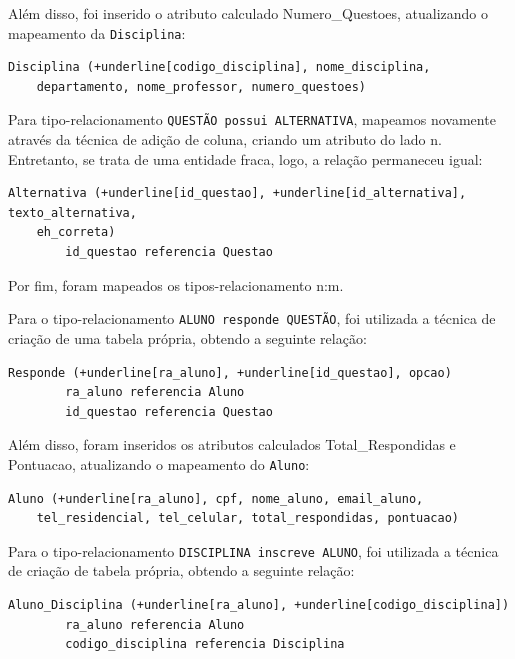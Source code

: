 \documentclass[12pt,a4paper]{article}
\begin{document}
Além disso, foi inserido o atributo calculado Numero\_Questoes, atualizando o mapeamento da \texttt{Disciplina}:

\begin{Verbatim}[commandchars=+\[\]]
    Disciplina (+underline[codigo_disciplina], nome_disciplina,
    departamento, nome_professor, numero_questoes)
\end{Verbatim}

Para tipo-relacionamento \texttt{QUESTÃO possui ALTERNATIVA}, mapeamos novamente através da técnica de adição de coluna, criando um atributo do lado n. Entretanto, se trata de uma entidade fraca, logo, a relação permaneceu igual:

\begin{Verbatim}[commandchars=+\[\]]
    Alternativa (+underline[id_questao], +underline[id_alternativa], texto_alternativa, 
    eh_correta)
        id_questao referencia Questao
\end{Verbatim}

Por fim, foram mapeados os tipos-relacionamento n:m.

Para o tipo-relacionamento \texttt{ALUNO responde QUESTÃO}, foi utilizada a técnica de criação de uma tabela própria, obtendo a seguinte relação:

\begin{Verbatim}[commandchars=+\[\]]
    Responde (+underline[ra_aluno], +underline[id_questao], opcao)
        ra_aluno referencia Aluno
        id_questao referencia Questao
\end{Verbatim}

Além disso, foram inseridos os atributos calculados Total\_Respondidas e Pontuacao, atualizando o mapeamento do \texttt{Aluno}:

\begin{Verbatim}[commandchars=+\[\]]
    Aluno (+underline[ra_aluno], cpf, nome_aluno, email_aluno, 
    tel_residencial, tel_celular, total_respondidas, pontuacao)
\end{Verbatim}

Para o tipo-relacionamento \texttt{DISCIPLINA inscreve ALUNO}, foi utilizada a técnica de criação de tabela própria, obtendo a seguinte relação:

\begin{Verbatim}[commandchars=+\[\]]
    Aluno_Disciplina (+underline[ra_aluno], +underline[codigo_disciplina])
        ra_aluno referencia Aluno
        codigo_disciplina referencia Disciplina
\end{Verbatim}
\end{document}
